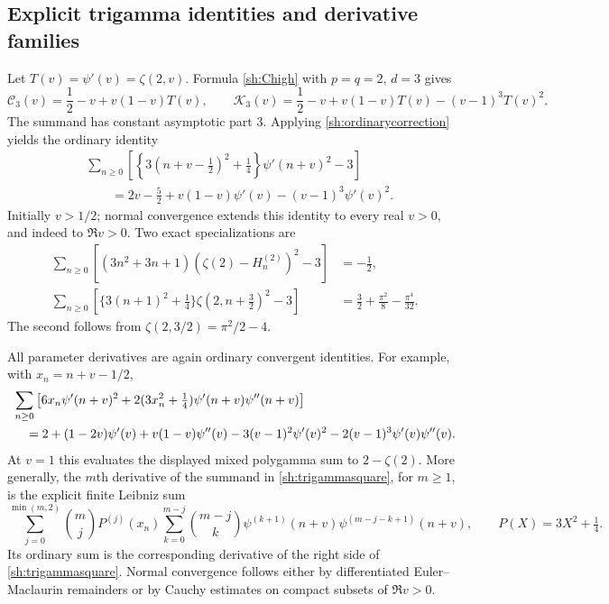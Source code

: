 \documentclass[11pt]{article}
\theoremstyle{definition}
\theoremstyle{remark}
\numberwithin{equation}{section}
\begin{document}
\subsection{Explicit trigamma identities and derivative families}

Let $T(v)=\psi'(v)=\zeta(2,v)$.  Formula \eqref{sh:Chigh} with
$p=q=2$, $d=3$ gives
\[
 \mathcal C_3(v)=\frac12-v+v(1-v)T(v),\qquad
 \mathcal K_3(v)=\frac12-v+v(1-v)T(v)-(v-1)^3T(v)^2.
\]
The summand has constant asymptotic part $3$.  Applying
\eqref{sh:ordinarycorrection} yields the ordinary identity
\begin{equation}\label{sh:trigammasquare}
 \boxed{\begin{aligned}
 &\sum_{n\ge0}\left[
    \left\{3(n+v-\tfrac12)^2+\tfrac14\right\}
                     \psi'(n+v)^2-3\right]\\
 &\qquad=2v-\frac52+v(1-v)\psi'(v)
                         -(v-1)^3\psi'(v)^2.
 \end{aligned}}
\end{equation}
Initially $v>1/2$; normal convergence extends this identity to every
real $v>0$, and indeed to $\Re v>0$.  Two exact specializations are
\begin{align}
 \sum_{n\ge0}\left[
       (3n^2+3n+1)(\zeta(2)-H_n^{(2)})^2-3\right]
       &=-\frac12,\label{sh:unshiftedsquare}\\
 \sum_{n\ge0}\left[
       \{3(n+1)^2+\tfrac14\}\zeta(2,n+\tfrac32)^2-3\right]
       &=\frac32+\frac{\pi^2}{8}-\frac{\pi^4}{32}.
       \label{sh:halflatticesquare}
\end{align}
The second follows from $\zeta(2,3/2)=\pi^2/2-4$.

All parameter derivatives are again ordinary convergent identities.
For example, with $x_n=n+v-1/2$,
\begin{align}\label{sh:squarederivative}
 &\sum_{n\ge0}\left[
  6x_n\psi'(n+v)^2
  +2(3x_n^2+\tfrac14)\psi'(n+v)\psi''(n+v)\right]\notag\\
 &\quad=2+(1-2v)\psi'(v)+v(1-v)\psi''(v)
      -3(v-1)^2\psi'(v)^2
      -2(v-1)^3\psi'(v)\psi''(v).
\end{align}
At $v=1$ this evaluates the displayed mixed polygamma sum to
$2-\zeta(2)$.  More generally, the $m$th derivative of the summand
in \eqref{sh:trigammasquare}, for $m\ge1$, is the explicit finite
Leibniz sum
\[
 \sum_{j=0}^{\min(m,2)}\binom mj P^{(j)}(x_n)
    \sum_{k=0}^{m-j}\binom{m-j}{k}
       \psi^{(k+1)}(n+v)\psi^{(m-j-k+1)}(n+v),
 \qquad P(X)=3X^2+\tfrac14.
\]
Its ordinary sum is the corresponding derivative of the right side
of \eqref{sh:trigammasquare}.  Normal convergence follows either
by differentiated Euler--Maclaurin remainders or by Cauchy estimates
on compact subsets of $\Re v>0$.
\end{document}
